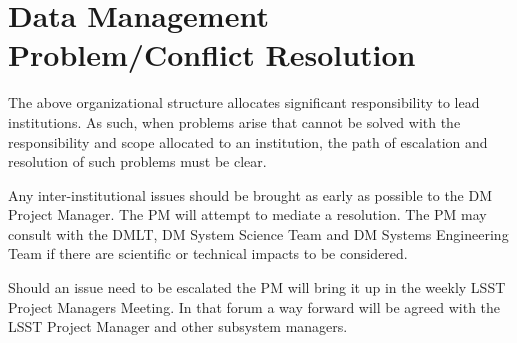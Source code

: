 \section{Data Management Problem/Conflict Resolution }
The above organizational structure allocates significant responsibility to lead institutions.
As such, when problems arise that cannot be solved with the responsibility and scope allocated to an institution, the path of escalation and resolution of such problems must be clear.

Any inter-institutional issues should be brought as early as possible to the DM Project Manager.
The PM will attempt to mediate a resolution.
The PM may consult with the DMLT, DM System Science Team and DM Systems Engineering Team if there are scientific or technical impacts to be considered.

Should an issue need to be escalated the PM will bring it up in the weekly LSST Project Managers Meeting.
In that forum a way forward will be agreed with the LSST Project Manager and other subsystem managers.
